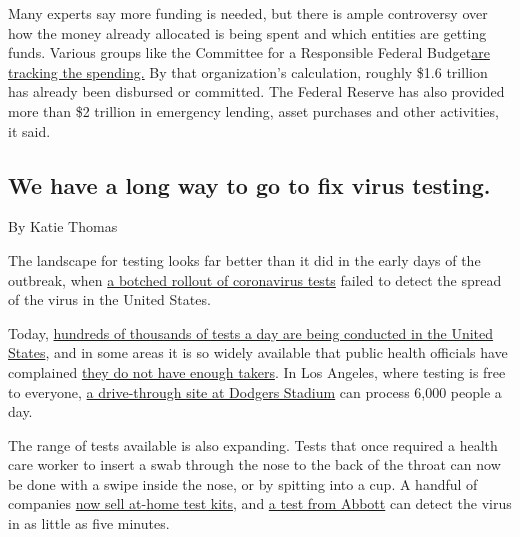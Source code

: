 Many experts say more funding is needed, but there is ample controversy
over how the money already allocated is being spent and which entities
are getting funds. Various groups like the Committee for a Responsible
Federal
Budget\href{http://www.crfb.org/blogs/covid-money-tracker-policies-enacted-to-date}{are
tracking the spending.} By that organization's calculation, roughly
\$1.6 trillion has already been disbursed or committed. The Federal
Reserve has also provided more than \$2 trillion in emergency lending,
asset purchases and other activities, it said.

\hypertarget{we-have-a-long-way-to-go-to-fix-virus-testing}{%
\subsection{We have a long way to go to fix virus
testing.}\label{we-have-a-long-way-to-go-to-fix-virus-testing}}

By Katie Thomas

The landscape for testing looks far better than it did in the early days
of the outbreak, when
\href{https://www.nytimes3xbfgragh.onion/2020/03/28/us/testing-coronavirus-pandemic.html}{a
botched rollout of coronavirus tests} failed to detect the spread of the
virus in the United States.

Today, \href{https://covidtracking.com/data/us-daily}{hundreds of
thousands of tests a day are being conducted in the United States}, and
in some areas it is so widely available that public health officials
have complained
\href{https://www.washingtonpost.com/health/as-coronavirus-testing-expands-a-new-problem-arises-not-enough-people-to-test/2020/05/17/3f3297de-8bcd-11ea-8ac1-bfb250876b7a_story.html}{they
do not have enough takers}. In Los Angeles, where testing is free to
everyone,
\href{https://www.latimes.com/california/story/2020-05-26/los-angeles-opens-largest-coronavirus-testing-site-at-dodger-stadiu}{a
drive-through site at Dodgers Stadium} can process 6,000 people a day.

The range of tests available is also expanding. Tests that once required
a health care worker to insert a swab through the nose to the back of
the throat can now be done with a swipe inside the nose, or by spitting
into a cup. A handful of companies
\href{https://www.nytimes3xbfgragh.onion/2020/04/21/health/fda-in-home-test-coronavirus.html}{now
sell at-home test kits}, and
\href{https://www.nytimes3xbfgragh.onion/interactive/2020/05/12/us/coronavirus-testing-white-house.html?action=click\&module=RelatedLinks\&pgtype=Article}{a
test from Abbott} can detect the virus in as little as five minutes.

